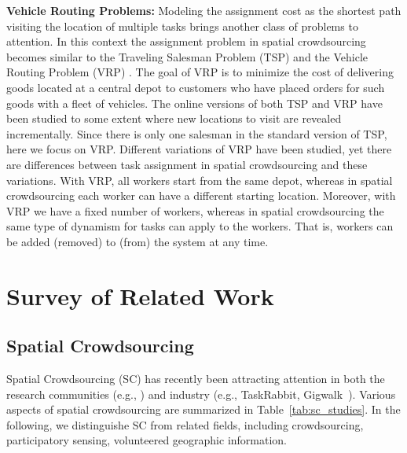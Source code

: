 \documentclass{USC-Thesis}
\numberwithin{equation}{chapter}
\begin{document}
\textbf{Vehicle Routing Problems:} Modeling the assignment cost as the shortest path visiting the location of multiple tasks brings another class of problems to attention. In this context the assignment problem in spatial crowdsourcing becomes similar to the Traveling Salesman Problem (TSP) \cite{lawler1985traveling} and the Vehicle Routing Problem (VRP) \cite{toth2001vehicle}. The goal of VRP is to minimize the cost of delivering goods located at a central depot to customers who have placed orders for such goods with a fleet of vehicles.  The online versions of both TSP and VRP have been studied to some extent where new locations to visit are revealed incrementally. Since there is only one salesman in the standard version of TSP, here we focus on VRP. Different variations of VRP have been studied, yet there are differences between task assignment in spatial crowdsourcing and these variations. 
With VRP, all workers start from the same depot, whereas in spatial crowdsourcing each worker can have a different starting location. Moreover, with VRP we have a fixed number of workers, whereas in spatial crowdsourcing the same type of dynamism for tasks can apply to the workers. That is, workers can be added (removed) to (from) the system at any time.

\chapter{Survey of Related Work}
\section{Spatial Crowdsourcing}
Spatial Crowdsourcing (SC) has recently been attracting attention in both the research communities (e.g., \cite{kazemi2012geocrowd,deng2013maximizing,to2014framework,to2016real,to2016sc}) and industry (e.g., TaskRabbit, Gigwalk~\cite{musthag2013labor}).
Various aspects of spatial crowdsourcing are summarized in Table~\ref{tab:sc_studies}.
In the following, we distinguishe SC from related fields, including crowdsourcing, participatory sensing, volunteered geographic information.
\end{document}
